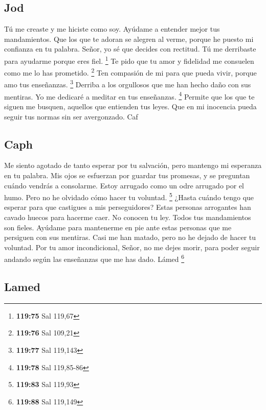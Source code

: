 \hypertarget{jod}{%
\subsection{Jod}\label{jod}}

 Tú me creaste y me hiciste como soy. Ayúdame a entender
mejor tus mandamientos.  Que los que te adoran se alegren
al verme, porque he puesto mi confianza en tu palabra. 
Señor, yo sé que decides con rectitud. Tú me derribaste para ayudarme
porque eres fiel. \footnote{\textbf{119:75} Sal 119,67} 
Te pido que tu amor y fidelidad me consuelen como me lo has prometido.
\footnote{\textbf{119:76} Sal 109,21}  Ten compasión de
mi para que pueda vivir, porque amo tus enseñanzas. \footnote{\textbf{119:77}
  Sal 119,143}  Derriba a los orgullosos que me han hecho
daño con sus mentiras. Yo me dedicaré a meditar en tus enseñanzas.
\footnote{\textbf{119:78} Sal 119,85-86}  Permite que los
que te siguen me busquen, aquellos que entienden tus leyes.
 Que en mi inocencia pueda seguir tus normas sin ser
avergonzado. Caf

\hypertarget{caph}{%
\subsection{Caph}\label{caph}}

 Me siento agotado de tanto esperar por tu salvación,
pero mantengo mi esperanza en tu palabra.  Mis ojos se
esfuerzan por guardar tus promesas, y se preguntan cuándo vendrás a
consolarme.  Estoy arrugado como un odre arrugado por el
humo. Pero no he olvidado cómo hacer tu voluntad. \footnote{\textbf{119:83}
  Sal 119,93}  ¿Hasta cuándo tengo que esperar para que
castigues a mis perseguidores?  Estas personas arrogantes
han cavado huecos para hacerme caer. No conocen tu ley. 
Todos tus mandamientos son fieles. Ayúdame para mantenerme en pie ante
estas personas que me persiguen con sus mentiras.  Casi
me han matado, pero no he dejado de hacer tu voluntad. 
Por tu amor incondicional, Señor, no me dejes morir, para poder seguir
andando según las enseñanzas que me has dado. Lámed \footnote{\textbf{119:88}
  Sal 119,149}

\hypertarget{lamed}{%
\subsection{Lamed}\label{lamed}}

